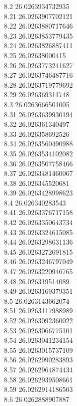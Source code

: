 {8.2	26.0263934732935\\
8.21	26.0263907702121\\
8.22	26.0263880717646\\
8.23	26.0263853779435\\
8.24	26.0263826887411\\
8.25	26.02638000415\\
8.26	26.0263773241627\\
8.27	26.0263746487716\\
8.28	26.0263719779692\\
8.29	26.026369311748\\
8.3	26.0263666501005\\
8.31	26.0263639930194\\
8.32	26.026361340497\\
8.33	26.026358692526\\
8.34	26.0263560490988\\
8.35	26.0263534102082\\
8.36	26.0263507758466\\
8.37	26.0263481460067\\
8.38	26.026345520681\\
8.39	26.0263428998623\\
8.4	26.026340283543\\
8.41	26.0263376717158\\
8.42	26.0263350643734\\
8.43	26.0263324615085\\
8.44	26.0263298631136\\
8.45	26.0263272691815\\
8.46	26.0263246797049\\
8.47	26.0263220946765\\
8.48	26.026319514089\\
8.49	26.0263169379351\\
8.5	26.0263143662074\\
8.51	26.0263117988989\\
8.52	26.0263092360022\\
8.53	26.0263066775101\\
8.54	26.0263041234154\\
8.55	26.0263015737109\\
8.56	26.0262990283893\\
8.57	26.0262964874434\\
8.58	26.0262939508661\\
8.59	26.0262914186503\\
8.6	26.0262888907887\\
}
